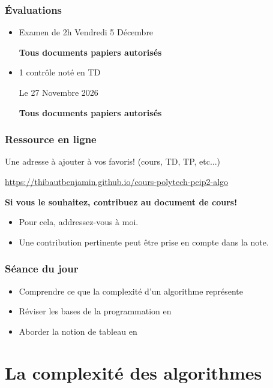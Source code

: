\documentclass[aspectratio=169]{beamer}
\begin{document}
\begin{frame}
  \frametitle{\'Evaluations}

  \begin{itemize}
  \item Examen de 2h Vendredi 5 Décembre

    \alert{\textbf{Tous documents papiers autorisés}}

  \item 1 contrôle noté en TD

    \alert{Le 27 Novembre 2026}

    \alert{\textbf{Tous documents papiers autorisés}}

  \end{itemize}

\end{frame}

\begin{frame}
  \frametitle{Ressource en ligne}

  Une adresse à ajouter à vos favoris! (cours, TD, TP, etc...)

  \url{https://thibautbenjamin.github.io/cours-polytech-peip2-algo}

  \vspace{1.5cm}
  \alert{\textbf{Si vous le souhaitez, contribuez au document de cours!}}

  \begin{itemize}
  \item Pour cela, addressez-vous à moi.
  \item Une contribution pertinente peut être prise en compte dans la note.
  \end{itemize}
\end{frame}

\begin{frame}
  \frametitle{Séance du jour}

  \begin{itemize}
  \item Comprendre ce que la complexité d'un algorithme représente
  \item Réviser les bases de la programmation en \Cpp
  \item Aborder la notion de tableau en \Cpp
  \end{itemize}

\end{frame}

\section{La complexité des algorithmes}
\end{document}
